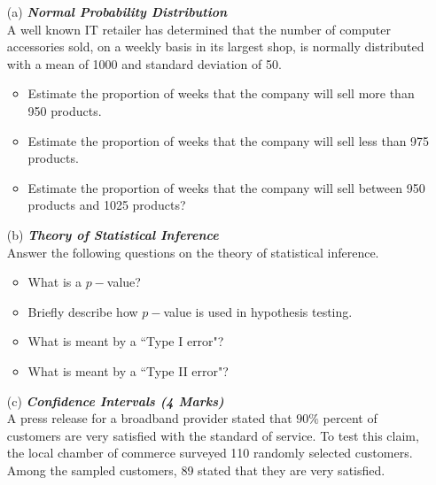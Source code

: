 \begin{itemize}

\item[(a)] \textbf{\textit{Normal Probability Distribution }}\\
A well known IT retailer has determined that the number of computer accessories sold, on a weekly basis in its largest shop, is normally distributed with a mean of 1000 and standard deviation of 50.
\begin{itemize}

\item  Estimate the proportion of weeks that the company will sell more than 950 products.


\item  Estimate the proportion of weeks that the company will sell less than 975 products.

\item  Estimate the proportion of weeks that the company will sell between 950
products and 1025 products?
\end{itemize}


\item[(b)] \textbf{\textit{Theory of Statistical Inference }}\\Answer the following questions on the theory of statistical inference.
\begin{itemize}

\item  What is a $p-$value?

\item  Briefly describe how $p-$value is used in hypothesis testing.

\item  What is meant by a ``Type I error"?

\item   What is meant by a ``Type II error"?
\end{itemize}
\bigskip


\item[(c)] \textbf{\textit{Confidence Intervals (4 Marks)}}\\
A press release for a broadband provider stated that $90\%$ percent of customers are very satisfied
with the standard of service. To test this claim, the local chamber of commerce surveyed 110 randomly selected customers. Among the sampled customers, 89 stated that they are very satisfied.






\end{itemize}
